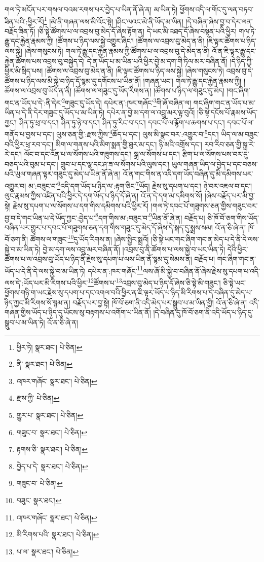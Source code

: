གལ་ཏེ་མངོན་པར་གསལ་བའམ་རགས་པར་བྱེད་པ་ཡིན་ནོ་ཞེ་ན། མ་ཡིན་ཏེ། ཕྱོགས་འདི་ལ་གོང་དུ་ལན་བཏབ་ཟིན་པའི་:ཕྱིར་རོ།\footnote{ཕྱིར་ཏེ།  སྣར་ཐང་།  པེ་ཅིན། } །མེ་ནི་གཞན་ལས་མི་འོང་སྟེ། །ཤིང་ལའང་མེ་ནི་ཡོད་མ་ཡིན། །དེ་བཞིན་ཞེས་བྱ་བ་དེར་ལན་བརྗོད་ཟིན་ཏོ། །ཅི་སྟེ་ཚོགས་པ་ལ་འབྲས་བུ་མེད་དོ་ཞེས་རྟོག་ན། དེ་ཡང་མི་འཐད་དོ་ཞེས་བསྟན་པའི་ཕྱིར། གལ་ཏེ་རྒྱུ་དང་རྐྱེན་རྣམས་ཀྱི། །ཚོགས་པ་ཉིད་ལས་སྐྱེ་འགྱུར་ཞིང་། །ཚོགས་ལ་འབྲས་བུ་མེད་ན་ནི། །ཇི་ལྟར་ཚོགས་པ་ཉིད་ལས་སྐྱེ། །ཞེས་གསུངས་ཏེ། གལ་ཏེ་རྒྱུ་དང་རྐྱེན་རྣམས་ཀྱི་ཚོགས་པ་ལ་འབྲས་བུ་དེ་མེད་ན་ནི། འོ་ན་ཇི་ལྟར་རྒྱུ་དང་རྐྱེན་ཚོགས་པས་འབྲས་བུ་བསྐྱེད་དེ། དེ་ན་ཡོད་པ་མ་ཡིན་པའི་ཕྱིར་བྱེ་མ་དག་གི་ཏིལ་མར་བཞིན་ནོ། །དེ་ཉིད་ཀྱི་ཕྱིར་མི་སྲིད་པས། །ཚོགས་ལ་འབྲས་བུ་མེད་ན་ནི། །ཇི་ལྟར་ཚོགས་པ་ཉིད་ལས་སྐྱེ། །ཞེས་གསུངས་ཏེ། འབྲས་བུ་དེ་ཚོགས་པ་ཉིད་ལས་མི་སྐྱེ་བ་ཉིད་དོ་སྙམ་དུ་དགོངས་པ་ཡིན་ནོ། །གཞན་ཡང་། གལ་ཏེ་རྒྱུ་དང་རྐྱེན་རྣམས་ཀྱི། །ཚོགས་ལ་འབྲས་བུ་ཡོད་ན་ནི། །ཚོགས་ལ་གཟུང་དུ་ཡོད་རིགས་ན། །ཚོགས་པ་ཉིད་ལ་གཟུང་དུ་མེད། །གང་ཞིག་གང་ན་ཡོད་པ་དེ་:ནི་དེར་\footnote{ནི་  སྣར་ཐང་།  པེ་ཅིན། }གཟུང་དུ་ཡོད་དེ། དཔེར་ན་:ཁར་གཞོང་\footnote{འཁར་གཞོང་  སྣར་ཐང་།  པེ་ཅིན། }གི་ཞོ་བཞིན་ལ། གང་ཞིག་གང་ན་ཡོད་པ་མ་ཡིན་པ་དེ་ནི་དེར་གཟུང་དུ་ཡོད་པ་མ་ཡིན་ཏེ། དཔེར་ན་བྱེ་མ་དག་ལ་འབྲུ་མར་ལྟ་བུའོ། །ཅི་སྟེ་དངོས་པོ་རྣམས་ཡོད་ཀྱང་། ཤིན་ཏུ་ཕྲ་བ་དང་། ཤིན་ཏུ་ཉེ་བ་དང་། ཤིན་ཏུ་རིང་བ་དང་། དབང་པོ་ལ་རྙོག་པ་ཆགས་པ་དང་། དབང་པོ་ལ་གནོད་པ་བྱས་པ་དང་། ལུས་ཅན་གྱི་:རྫས་ཀྱིས་\footnote{རྫས་ཀྱི་  པེ་ཅིན། }ཆོད་པ་དང་། ལུས་མི་སྣང་བར་:འགྱུར་བ་\footnote{གྱུར་པ་  སྣར་ཐང་།  པེ་ཅིན། }དང་། ཡིད་ལ་མ་བཟུང་བའི་ཕྱིར་ཕྲ་རབ་དང་། མིག་ལ་གནས་པའི་མིག་སྨན་གྱི་ཐུར་མ་དང་། ཉི་མའི་འགྲོས་དང་། རབ་རིབ་ཅན་གྱི་སྐྲ་རེ་རེ་དང་། ལོང་བ་དང་འོན་པ་ལ་སོགས་པའི་གཟུགས་དང་། སྒྲ་ལ་སོགས་པ་དང་། རྩིག་པ་ལ་སོགས་པས་བར་དུ་བཅད་པའི་བུམ་པ་དང་། གྲུབ་པ་དང་ལྷ་དང་ཤ་ཟ་ལ་སོགས་པའི་ལུས་དང་། ཡུལ་གཞན་ཡིད་ལ་བྱེད་པ་དང་བཅས་པའི་ཡུལ་གཞན་ལྟར་གཟུང་དུ་མེད་པ་ཡིན་ནོ་ཞེ་ན། འོ་ན་གང་གིས་ན་འདི་དག་ཡོད་བཞིན་དུ་མི་དམིགས་པར་འགྱུར་བ། མ་:བཟུང་བ་\footnote{གཟུང་བ་  སྣར་ཐང་།  པེ་ཅིན། }འདི་དག་ཡོད་པ་ཉིད་ལ་:རྟག་ཅིང་\footnote{རྟགས་ཅི་  སྣར་ཐང་།  པེ་ཅིན། }ཡོད། རྗེས་སུ་དཔག་པ་དང་། ཉེ་བར་འཇལ་བ་དང་། ལུང་རྣམས་ཀྱིས་འཛིན་པའི་ཕྱིར་དེ་དག་ཡོད་པ་ཉིད་དོ་ཞེ་ན། འོ་ན་དེ་དག་མ་དམིགས་སོ། །ཞེས་བརྗོད་པར་མི་བྱ་སྟེ། རྗེས་སུ་དཔག་པ་ལ་སོགས་པ་དག་གིས་དམིགས་པའི་ཕྱིར་རོ། །གལ་ཏེ་དབང་པོ་གཟུགས་ཅན་གྱིས་གཟུང་བར་བྱ་བ་དེ་གང་ཡིན་པ་དེ་ཡོད་ཀྱང་:བྱེད་པ་\footnote{བྱེད་པ་དེ་  སྣར་ཐང་།  པེ་ཅིན། }དག་གིས་མ་:བཟུང་བ་\footnote{གཟུང་བ་  པེ་ཅིན། }ཡིན་ནོ་ཞེ་ན། བརྗོད་པ། ཅི་ཁོ་བོ་ཅག་གིས་ཡོད་བཞིན་པར་གྱུར་པ་དབང་པོ་གཟུགས་ཅན་དག་གིས་གཟུང་དུ་མེད་དོ་ཞེས་དེ་སྐད་དུ་སྨྲས་སམ། འོ་ན་ཅི་ཞེ་ན། ཁོ་བོ་ཅག་ནི། ཚོགས་ལ་གཟུང་\footnote{བཟུང་  སྣར་ཐང་། }དུ་ཡོད་རིགས་ན། །ཞེས་སྤྱིར་སྨྲའོ། །ཅི་སྟེ་ཡང་གང་ཞིག་གང་ན་མེད་པ་དེ་ནི་དེ་ལས་སྐྱེ་བ་མ་ཡིན་ཏེ། བྱེ་མ་དག་ལས་འབྲུ་མར་བཞིན་ནོ། །འབྲས་བུ་ནི་ཚོགས་པ་ལས་སྐྱེ་བ་ཡང་ཡིན་ཏེ། དེའི་ཕྱིར་ཚོགས་པ་ལ་འབྲས་བུ་ཡོད་པ་ཉིད་ནི་རྗེས་སུ་དཔག་པ་ལས་ཡིན་ནོ་སྙམ་དུ་སེམས་ན། བརྗོད་པ། གང་ཞིག་གང་ན་ཡོད་པ་དེ་ནི་དེ་ལས་སྐྱེ་བ་མ་ཡིན་ཏེ། དཔེར་ན་:ཁར་གཞོང་\footnote{འཁར་གཞོང་  སྣར་ཐང་།  པེ་ཅིན། }ལས་ཞོ་མི་སྐྱེ་བ་བཞིན་ནོ་ཞེས་རྗེས་སུ་དཔག་པ་འདི་ལས་དེ་:ཡོད་པར་མི་རིགས་པའི་ཕྱིར་\footnote{མི་རིགས་པའི་  སྣར་ཐང་།  པེ་ཅིན། }ཚོགས་པ་\footnote{པ་ལ་  སྣར་ཐང་།  པེ་ཅིན། }འབྲས་བུ་མེད་པ་ཉིད་དོ་ཞེས་ཅི་སྟེ་མི་གཟུང་། ཅི་སྟེ་ཡང་ཕྱོགས་གཉི་ག་ཡང་རྗེས་སུ་དཔག་པ་དང་འགལ་བའི་ཕྱིར་ན་ཇི་ལྟར་ཡོད་པ་ཉིད་མི་རིགས་པ་དེ་བཞིན་དུ་མེད་པ་ཉིད་ཀྱང་མི་རིགས་སོ་སྙམ་ན། བརྗོད་པར་བྱ་སྟེ། ཁོ་བོ་ཅག་ནི་འདི་མེད་པར་སྒྲུབ་པ་མ་ཡིན་གྱི། འོ་ན་ཅི་ཞེ་ན། འདི་གཞན་གྱིས་ཡོད་པ་ཉིད་དུ་ཡོངས་སུ་བརྟགས་པ་འགོག་པ་ཡིན་ནོ། །དེ་བཞིན་དུ་ཁོ་བོ་ཅག་ནི་འདི་ཡོད་པ་ཉིད་དུ་སྒྲུབ་པ་མ་ཡིན་ཏེ། འོ་ན་ཅི་ཞེ་ན། 